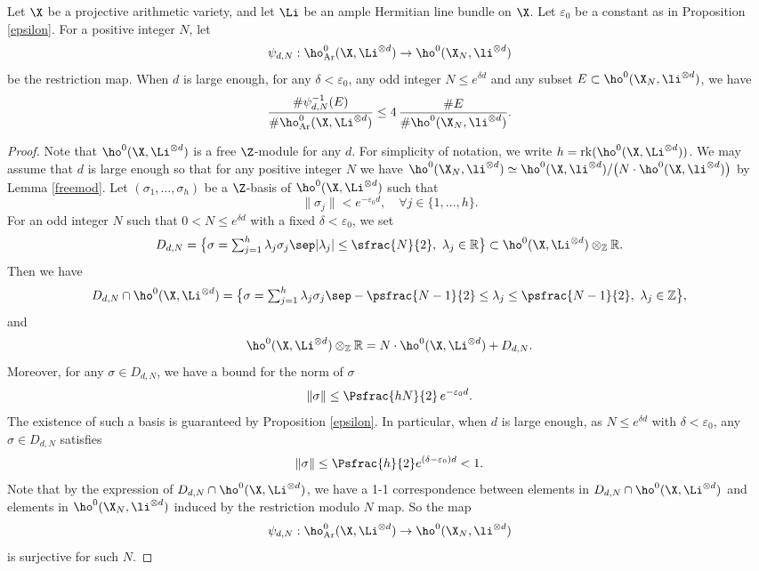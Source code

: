 \begin{prop}\label{ed}
Let $\X$ be a projective arithmetic variety, and let $\Li$ be an ample Hermitian line bundle on $\X$. Let $\varepsilon_0$ be a constant as in Proposition \ref{epsilon}. For a positive integer $N$, let
\[
\psi_{d,N}: \ho^0_{\mathrm{Ar}}(\X,\Li^{\otimes d}) \to \ho^0(\X_{N},\li^{\otimes d})
\]
be the restriction map. When $d$ is large enough, for any $\delta<\varepsilon_0$, any odd integer $N\leq e^{\delta d}$ and any subset $E\subset \ho^0(\X_{N},\li^{\otimes d}) $,
we have
\[
\frac{\#\psi_{d,N}^{-1}(E)}{\# \ho^0_{\mathrm{Ar}}(\X,\Li^{\otimes d})}\leq 4\, \frac{\#E}{\#\ho^0(\X_{N},\li^{\otimes d})}.
\]
\end{prop}
\begin{proof}[Proof]
Note that $\ho^0(\X,\Li^{\otimes d})$ is a free $\Z$-module for any $d$. For simplicity of notation, we write $h=\mathrm{rk}(\ho^0(\X,\Li^{\otimes d}))$. We may assume that $d$ is large enough so that for any positive integer $N$ we have $\ho^0(\X_N,\li^{\otimes d})\simeq\ho^0(\X,\li^{\otimes d})/\big(N\cdot \ho^0(\X,\li^{\otimes d})\big)$ by Lemma \ref{freemod}. Let $(\sigma_1,\dots, \sigma_h)$ be a $\Z$-basis of $\ho^0(\X,\Li^{\otimes d})$ such that
\[
\lVert \sigma_j\rVert <e^{-\varepsilon_0 d}, \quad \forall j\in \{ 1,\dots, h \}.
\]
For an odd integer $N$ such that $0<N\leq e^{\delta d}$ with a fixed $\delta<\varepsilon_0$, we set
\[\textstyle
D_{d,N}=\bigl\{ \sigma=\sum_{j=1}^{h}\lambda_j \sigma_j\sep |\lambda_j|\leq \sfrac{N}{2},\ \lambda_j\in \mathbb{R} \bigr\}\subset \ho^0(\X,\Li^{\otimes d})\otimes_{ \mathbb{Z}}\mathbb{R}.
\]
Then we have
\[\textstyle
D_{d,N}\cap \ho^0(\X,\Li^{\otimes d})=
\bigl\{ \sigma=\sum_{j=1}^{h}\lambda_j \sigma_j\sep -\psfrac{N-1}{2}\leq \lambda_j\leq \psfrac{N-1}{2},\ \lambda_j\in \mathbb{Z} \bigr\},
\]
and
\[
\ho^0(\X,\Li^{\otimes d})\otimes_{ \mathbb{Z}}\mathbb{R}=N\cdot \ho^0(\X,\Li^{\otimes d}) +D_{d, N}.
\]
Moreover, for any $\sigma \in D_{d,N}$, we have a bound for the norm of $\sigma$
\[
\lVert \sigma\rVert \leq \Psfrac{hN}{2}\,e^{-\varepsilon_0 d}.
\]
The existence of such a basis is guaranteed by Proposition \ref{epsilon}. In particular, when $d$ is large enough, as $N\leq e^{\delta d}$ with $\delta <\varepsilon_0$, any $\sigma \in D_{d,N}$ satisfies
\[
\lVert \sigma\rVert \leq \Psfrac{h}{2} e^{(\delta-\varepsilon_0) d}<1.
\]
Note that by the expression of $D_{d,N}\cap \ho^0(\X,\Li^{\otimes d})$, we have a 1-1 correspondence between elements in $D_{d,N}\cap \ho^0(\X,\Li^{\otimes d}) $ and elements in $\ho^0(\X_N, \li^{\otimes d})$ induced by the restriction modulo $N$ map. So the map
\[
\psi_{d,N}: \ho^0_{\mathrm{Ar}}(\X, \Li^{\otimes d}) \to \ho^0(\X_N, \li^{\otimes d})
\]
is surjective for such $N$.


\end{proof}
